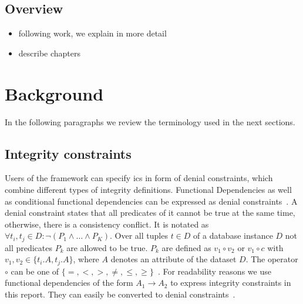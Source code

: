   \subsection{Overview}
  \begin{itemize}
    \item following work, we explain \holoclean{} in more detail
    \item describe chapters
  \end{itemize}


\section{Background}\label{sec:background}
  In the following paragraphs we review the terminology used in the next sections.
  
  \subsection{Integrity constraints}
  Users of the \holoclean{} framework can specify \glspl{ic} in form of denial constraints, which combine different types of integrity definitions.
  Functional Dependencies as well as conditional functional dependencies can be expressed as denial constraints~\cite{fd_to_dc}.
  A denial constraint states that all predicates of it cannot be true at the same time, otherwise, there is a consistency conflict.
  It is notated as $\forall t_i, t_j \in D: \neg(P_1 \wedge \dots \wedge P_K)$.
  Over all tuples $t \in D$ of a database instance $D$ not all predicates $P_k$ are allowed to be true.
  $P_k$ are defined as $v_1 \circ v_2$ or $v_1 \circ c$ with $v_1, v_2 \in \{t_i.A, t_j.A\}$, where $A$ denotes an attribute of the dataset $D$.
  The operator $\circ$ can be one of $\{=,<,>,\neq,\leq,\geq\}$~\cite{chu2013discoveringdc}.
  For readability reasons we use functional dependencies of the form $A_1 \to A_2$ to express integrity constraints in this report.
  They can easily be converted to denial constraints~\cite{fd_to_dc}.
  
